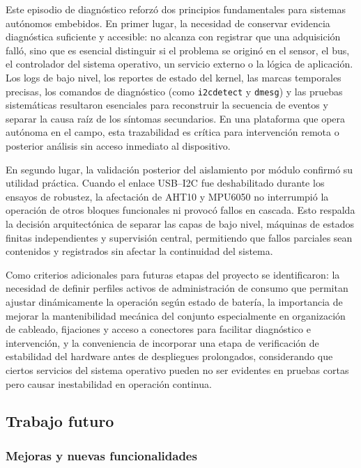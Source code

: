 Este episodio de diagnóstico reforzó dos principios fundamentales para sistemas autónomos embebidos. En primer lugar, la necesidad de conservar evidencia diagnóstica suficiente y accesible: no alcanza con registrar que una adquisición falló, sino que es esencial distinguir si el problema se originó en el sensor, el bus, el controlador del sistema operativo, un servicio externo o la lógica de aplicación. Los logs de bajo nivel, los reportes de estado del kernel, las marcas temporales precisas, los comandos de diagnóstico (como \texttt{i2cdetect} y \texttt{dmesg}) y las pruebas sistemáticas resultaron esenciales para reconstruir la secuencia de eventos y separar la causa raíz de los síntomas secundarios. En una plataforma que opera autónoma en el campo, esta trazabilidad es crítica para intervención remota o posterior análisis sin acceso inmediato al dispositivo.

En segundo lugar, la validación posterior del aislamiento por módulo confirmó su utilidad práctica. Cuando el enlace USB--I2C fue deshabilitado durante los ensayos de robustez, la afectación de AHT10 y MPU6050 no interrumpió la operación de otros bloques funcionales ni provocó fallos en cascada. Esto respalda la decisión arquitectónica de separar las capas de bajo nivel, máquinas de estados finitas independientes y supervisión central, permitiendo que fallos parciales sean contenidos y registrados sin afectar la continuidad del sistema.

Como criterios adicionales para futuras etapas del proyecto se identificaron: la necesidad de definir perfiles activos de administración de consumo que permitan ajustar dinámicamente la operación según estado de batería, la importancia de mejorar la mantenibilidad mecánica del conjunto especialmente en organización de cableado, fijaciones y acceso a conectores para facilitar diagnóstico e intervención, y la conveniencia de incorporar una etapa de verificación de estabilidad del hardware antes de despliegues prolongados, considerando que ciertos servicios del sistema operativo pueden no ser evidentes en pruebas cortas pero causar inestabilidad en operación continua.

\subsection{Trabajo futuro}

\subsubsection{Mejoras y nuevas funcionalidades}

